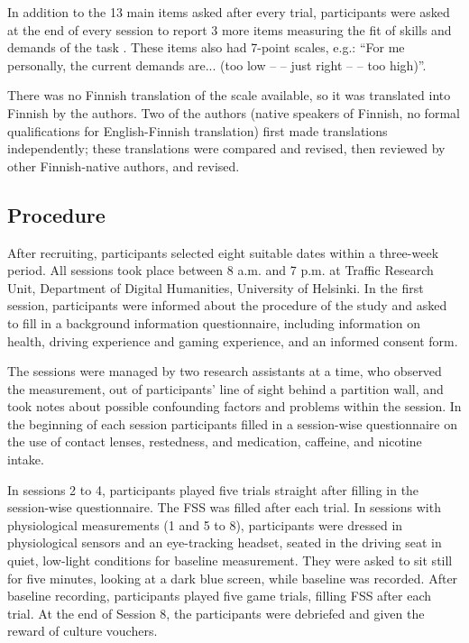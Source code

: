 \documentclass{frontierstyle/frontiersSCNS}
\begin{document}
In addition to the 13 main items asked after every trial, participants were asked at the end of every session to report 3 more items measuring the fit of skills and demands of the task  \citep{Rheinberg2003}. These items also had 7-point scales, e.g.: ``For me personally, the current demands are... (too low -- -- just right -- -- too high)''.

There was no Finnish translation of the scale available, so it was translated into Finnish by the authors. Two of the authors (native speakers of Finnish, no formal qualifications for English-Finnish translation) first made translations independently; these translations were compared and revised, then reviewed by other Finnish-native authors, and revised.

\subsection{Procedure}
After recruiting, participants selected eight suitable dates within a three-week period. All sessions took place between 8 a.m. and 7 p.m. at Traffic Research Unit, Department of Digital Humanities, University of Helsinki. In the first session, participants were informed about the procedure of the study and asked to fill in a background information questionnaire, including information on health, driving experience and gaming experience, and an informed consent form.

The sessions were managed by two research assistants at a time, who observed the measurement, out of participants' line of sight behind a partition wall, and took notes about possible confounding factors and problems within the session. In the beginning of each session participants filled in a session-wise questionnaire on the use of contact lenses, restedness, and medication, caffeine, and nicotine intake.

In sessions 2 to 4, participants played five trials straight after filling in the session-wise questionnaire. The FSS was filled after each trial. In sessions with physiological measurements (1 and 5 to 8), participants were dressed in physiological sensors and an eye-tracking headset, seated in the driving seat in quiet, low-light conditions for baseline measurement. They were asked to sit still for five minutes, looking at a dark blue screen, while baseline was recorded. After baseline recording, participants played five game trials, filling FSS after each trial. At the end of Session 8, the participants were debriefed and given the reward of culture vouchers.
\end{document}
